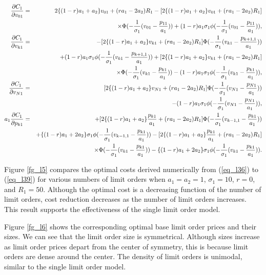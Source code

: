 \begin{eqnarray}
  \frac{\partial C_1}{\partial v_{01}} & = &  2\{(1-r)a_1+a_2\}v_{01}+(ra_1-2a_2)R_1 - [2\{(1-r)a_1+a_2\}v_{01}+(ra_1-2a_2)R_1]
  \nonumber \\
  & & \times \Phi(-\frac{1}{\sigma_1}(v_{01}-\frac{p_{11}}{a_1}))
        +(1-r)a_1\sigma_1 \phi(-\frac{1}{\sigma_1}(v_{01}-\frac{p_{11}}{a_1})), \label{eq_l36} \\
  \frac{\partial C_1}{\partial v_{k1}} & = & - [2\{(1-r)a_1+a_2\}v_{k1}+(ra_1-2a_2)R_1]\Phi(-\frac{1}{\sigma_1}(v_{k1}-\frac{p_{k+1,1}}{a_1})) \nonumber \\
  & & +(1-r)a_1\sigma_1 \phi(-\frac{1}{\sigma_1}(v_{k1}-\frac{p_{k+1,1}}{a_1})) + [2\{(1-r)a_1+a_2\}v_{k1}+(ra_1-2a_2)R_1] \nonumber \\
  & & \times \Phi(-\frac{1}{\sigma_1}(v_{k1}-\frac{p_{k1}}{a_1}))-(1-r)a_1\sigma_1 \phi(-\frac{1}{\sigma_1}(v_{k1}-\frac{p_{k1}}{a_1})), \label{eq_l37} \\
  \frac{\partial C_1}{\partial v_{N1}} & = & [2\{(1-r)a_1+a_2\}v_{N1}+(ra_1-2a_2)R_1]\Phi(-\frac{1}{\sigma_1}(v_{N1}-\frac{p_{N1}}{a_1})) \nonumber \\
  & & -(1-r)a_1\sigma_1 \phi(-\frac{1}{\sigma_1}(v_{N1}-\frac{p_{N1}}{a_1})), \label{eq_l38} \\
  a_1\frac{\partial C_1}{\partial p_{k1}} & = & + [2\{(1-r)a_1+a_2\}\frac{p_{k1}}{a_1}+(ra_1-2a_2)R_1]\Phi(-\frac{1}{\sigma_1}(v_{k-1,1}-\frac{p_{k1}}{a_1})) \nonumber \\
                     &   & +\{(1-r)a_1+2a_2\}\sigma_1 \phi(-\frac{1}{\sigma_1}(v_{k-1,1}-\frac{p_{k1}}{a_1}))
                           - [2\{(1-r)a_1+a_2\}\frac{p_{k1}}{a_1}+(ra_1-2a_2)R_1] \nonumber \\
     & & \times \Phi(-\frac{1}{\sigma_1}(v_{k1}-\frac{p_{k1}}{a_1}))-\{(1-r)a_1+2a_2\}\sigma_1 \phi(-\frac{1}{\sigma_1}(v_{k1}-\frac{p_{k1}}{a_1})). \label{eq_l39}
\end{eqnarray}

Figure \ref{fg_l5} compares the optimal costs derived numerically from (\ref{eq_l36}) to (\ref{eq_l39}) for various numbers of limit orders when $a_1=a_2=1$, $\sigma_1=10$, $r=0$, and $R_1=50$.  Although the optimal cost is a decreasing function of the number of limit orders, cost reduction decreases as the number of limit orders increases.  This result supports the effectiveness of the single limit order model.

Figure \ref{fg_l6} shows the corresponding optimal base limit order prices and their sizes.  We can see that the limit order size is symmetrical.  Although sizes increase as limit order prices depart from the center of symmetry, this is because limit orders are dense around the center.  The density of limit orders is unimodal, similar to the single limit order model.


